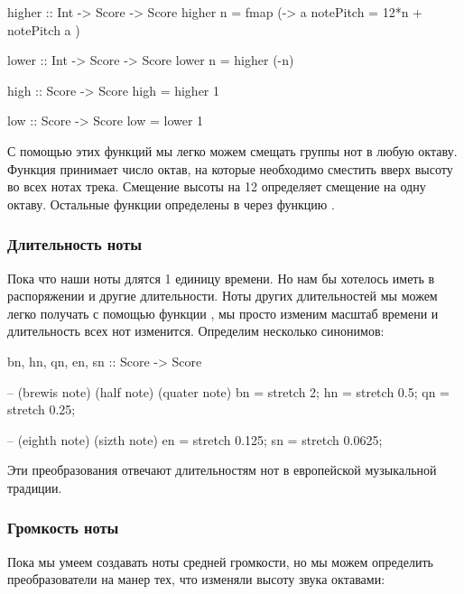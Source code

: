 \begin{code}
higher :: Int -> Score -> Score
higher n = fmap (\a -> a{ notePitch = 12*n + notePitch a })

lower :: Int -> Score -> Score 
lower n = higher (-n)

high :: Score -> Score
high = higher 1

low :: Score -> Score 
low = lower 1
\end{code}

С помощью этих функций мы легко можем смещать группы нот в любую октаву.
Функция  принимает число октав, на которые необходимо
сместить вверх высоту во всех нотах трека. Смещение высоты на 12
определяет смещение на одну октаву. Остальные функции определены в через
функцию .

\subsubsection{Длительность ноты}

Пока что наши ноты длятся 1 единицу времени. Но нам бы хотелось иметь в
распоряжении и другие длительности. Ноты других длительностей мы можем
легко получать с помощью функции , мы просто изменим масштаб
времени и длительность всех нот изменится. Определим несколько
синонимов:


\begin{code}
bn, hn, qn, en, sn :: Score -> Score

-- (brewis note)   (half note)         (quater note)
bn = stretch 2;    hn = stretch 0.5;   qn = stretch 0.25;

-- (eighth note)      (sizth note)
en = stretch 0.125;   sn = stretch 0.0625;
\end{code}

Эти преобразования отвечают длительностям нот в европейской музыкальной
традиции.

\subsubsection{Громкость ноты}

Пока мы умеем создавать ноты средней громкости, но мы можем определить
преобразователи на манер тех, что изменяли высоту звука октавами:



